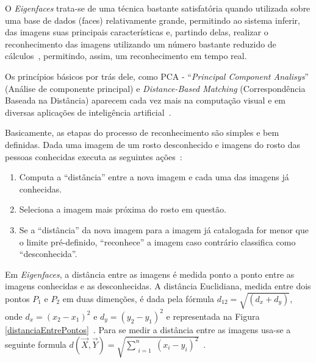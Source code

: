 	O \textit{Eigenfaces} trata-se de uma técnica bastante satisfatória quando utilizada
	sobre uma base de dados (faces) relativamente grande, permitindo ao sistema
	inferir, das imagens suas principais características e, partindo delas, realizar
	o reconhecimento das imagens utilizando um número bastante reduzido de
	cálculos~\cite{artigo-eigenface}, permitindo, assim, um reconhecimento em tempo
	real.
	
	Os princípios básicos por trás dele, como PCA - ``\textit{Principal Component
	Analisys}'' (Análise de componente principal) e \textit{Distance-Based
	Matching} (Correspondência Baseada na Distância) aparecem cada vez mais na computação
	visual e em diversas aplicações de inteligência artificial~\cite{hewitt}.
	
	Basicamente, as etapas do processo de reconhecimento são simples e bem
	definidas. Dada uma imagem de um rosto desconhecido e imagens do rosto das
	pessoas conhecidas executa as seguintes ações~\cite{hewitt}:

	\begin{enumerate}
		\item Computa a ``distância'' entre a nova imagem e cada uma das imagens já conhecidas.
		\item Seleciona a imagem mais próxima	 do rosto em questão.
		\item Se a ``distância'' da nova imagem para a imagem já catalogada for menor que o limite pré-definido, ``reconhece'' a imagem caso contrário classifica como ``desconhecida''.
	\end{enumerate}

	Em \textit{Eigenfaces}, a distância entre as imagens é medida ponto a ponto
	entre as imagens conhecidas e as desconhecidas. A distância Euclidiana, medida
	entre dois pontos $P_1$ e $P_2$ em duas dimenções, é dada pela fórmula
	$\displaystyle d_{12} = \sqrt{(d_{x} + d_{y})}$, onde $\displaystyle d_x = (x_2
	- x_1)^2$ e $\displaystyle d_y = (y_2-y_1)^2$ e representada na Figura
	\ref{distanciaEntrePontos}~\cite{hewitt}. Para se medir a distância entre as
	imagens usa-se a seguinte formula $\displaystyle d(\vec{X}, \vec{Y}) =
	\sqrt{\sum_{\substack{i=1}}^{n} (x_i-y_i)^2}$~\cite{perlibakas}.

